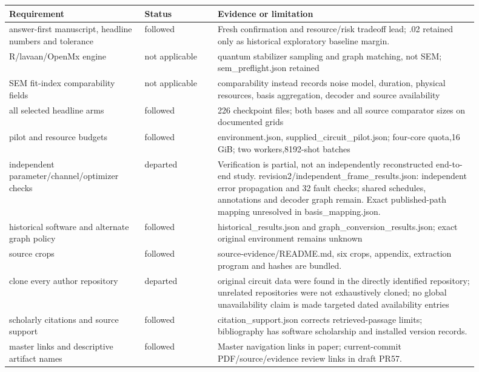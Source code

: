 \small\begin{longtable}{p{0.26\linewidth}p{0.14\linewidth}p{0.5\linewidth}}
\toprule Requirement & Status & Evidence or limitation\\\midrule\endhead
answer-first manuscript, headline numbers and tolerance & followed &  Fresh confirmation and resource/risk tradeoff lead; .02 retained only as historical exploratory baseline margin.\\
R/lavaan/OpenMx engine & not applicable &  quantum stabilizer sampling and graph matching, not SEM; sem\_preflight.json retained\\
SEM fit-index comparability fields & not applicable &  comparability instead records noise model, duration, physical resources, basis aggregation, decoder and source availability\\
all selected headline arms & followed &  226 checkpoint files; both bases and all source comparator sizes on documented grids\\
pilot and resource budgets & followed &  environment.json, supplied\_circuit\_pilot.json; four-core quota,16 GiB; two workers,8192-shot batches\\
independent parameter/channel/optimizer checks & departed & Verification is partial, not an independently reconstructed end-to-end study. revision2/independent\_frame\_results.json: independent error propagation and 32 fault checks; shared schedules, annotations and decoder graph remain. Exact published-path mapping unresolved in basis\_mapping.json.\\
historical software and alternate graph policy & followed &  historical\_results.json and graph\_conversion\_results.json; exact original environment remains unknown\\
source crops & followed &  source-evidence/README.md, six crops, appendix, extraction program and hashes are bundled.\\
clone every author repository & departed & original circuit data were found in the directly identified repository; unrelated repositories were not exhaustively cloned; no global unavailability claim is made targeted dated availability entries\\
scholarly citations and source support & followed &  citation\_support.json corrects retrieved-passage limits; bibliography has software scholarship and installed version records.\\
master links and descriptive artifact names & followed &  Master navigation links in paper; current-commit PDF/source/evidence review links in draft PR57.\\

\end{longtable}
